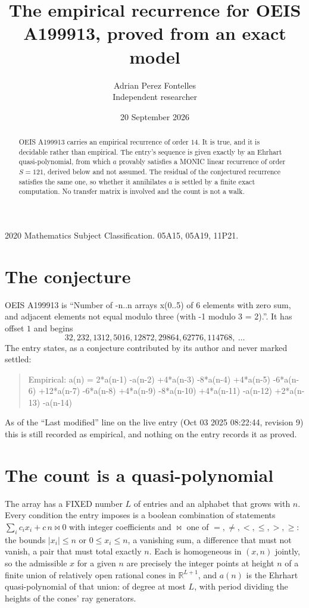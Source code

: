 \documentclass[11pt,a4paper]{article}
\title{The empirical recurrence for OEIS A199913, proved from an exact model}
\author{Adrian Perez Fontelles\\ \small Independent researcher}
\date{20 September 2026}
\theoremstyle{plain}
\theoremstyle{definition}
\begin{document}
\maketitle

\begin{abstract}
OEIS A199913 carries an empirical recurrence of order $14$. It is true, and it is
decidable rather than empirical. The entry's sequence is given exactly by an Ehrhart quasi-polynomial, from
which $a$ provably satisfies a MONIC linear recurrence of order $S=121$, derived below and not
assumed. The residual of the conjectured recurrence satisfies the same one, so whether it
annihilates $a$ is settled by a finite exact computation. No transfer matrix is involved and the count is not a walk.
\end{abstract}

\noindent\small 2020 Mathematics Subject Classification. 05A15, 05A19, 11P21.\normalsize

\section{The conjecture}

OEIS A199913 is ``Number of -n..n arrays x(0..5) of 6 elements with zero sum, and adjacent elements not equal modulo three (with -1 modulo 3 = 2).''. It has offset $1$ and begins
\[
32, 232, 1312, 5016, 12872, 29864, 62776, 114768,\ \dots
\]
The entry states, as a conjecture contributed by its author and never marked settled:
\begin{quote}
Empirical: a(n) = 2*a(n-1) -a(n-2) +4*a(n-3) -8*a(n-4) +4*a(n-5) -6*a(n-6) +12*a(n-7) -6*a(n-8) +4*a(n-9) -8*a(n-10) +4*a(n-11) -a(n-12) +2*a(n-13) -a(n-14)
\end{quote}
As of the ``Last modified'' line on the live entry (Oct 03 2025 08:22:44, revision 9)
this is still recorded as empirical, and nothing on the entry records it as proved.

\section{The count is a quasi-polynomial}

The array has a FIXED number $L$ of entries and an alphabet that grows with $n$. Every
condition the entry imposes is a boolean combination of statements
$\sum_i c_ix_i + c\,n \bowtie 0$ with integer coefficients and $\bowtie$ one of
$=,\ne,<,\le,>,\ge$: the bounds $|x_i|\le n$ or $0\le x_i\le n$, a vanishing sum, a difference
that must not vanish, a pair that must total exactly $n$. Each is homogeneous in $(x,n)$
jointly, so the admissible $x$ for a given $n$ are precisely the integer points at height $n$
of a finite union of relatively open rational cones in $\mathbb{R}^{L+1}$, and $a(n)$ is
the Ehrhart quasi-polynomial of that union: of degree at most $L$, with period dividing the
heights of the cones' ray generators.
\end{document}
